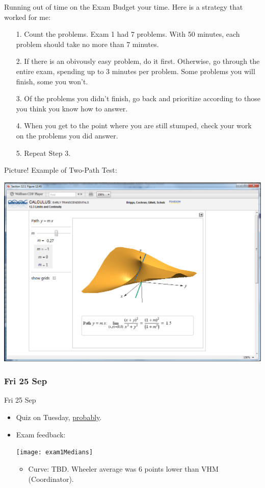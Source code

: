 \documentclass[12pt]{beamer}
\theoremstyle{plain}
\theoremstyle{definition}
\begin{document}
%
\begin{frame}{\small Running out of time on the Exam}\footnotesize
Budget your time.  Here is a strategy that worked for me:
\begin{itemize}
\item[1. ] Count the problems.  Exam 1 had 7 problems.  With 50 minutes, each problem should take no more than 7 minutes.
\item[2. ] If there is an obivously easy problem, do it first.  Otherwise, go through the entire exam, spending up to 3 minutes per problem.  Some problems you will finish, some you won't.
\item[3. ] Of the problems you didn't finish, go back and prioritize according to those you think you know how to answer.
\item[4. ] When you get to the point where you are still stumped, check your work on the problems you did answer.
\item[5. ] Repeat Step 3. 
\end{itemize}
\end{frame}

%
\begin{frame}{\small Picture!}\footnotesize
Example of Two-Path Test:
\begin{center}
\includegraphics[scale=0.27]{12-3twoPathTest}
\end{center}
\end{frame}

\subsubsection{Fri 25 Sep}
\begin{frame}{Fri 25 Sep}%
\begin{itemize}
\item Quiz on Tuesday, \underline{probably}.
\item Exam feedback:

\vspace{0.5pc}
\texttt{[image: exam1Medians]}
	\begin{itemize}
	\item Curve: TBD.  Wheeler average was 6 points lower than VHM (Coordinator).
	\end{itemize}
\end{itemize}
\end{frame}
\end{document}
